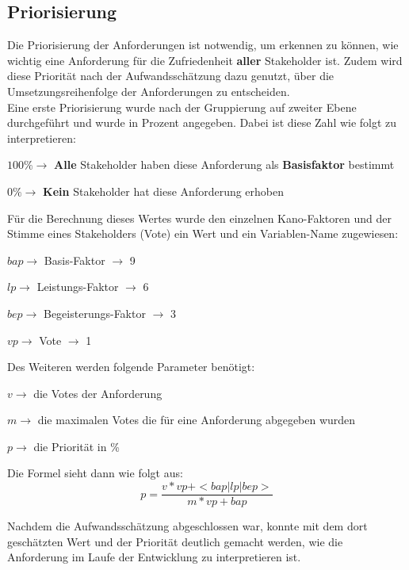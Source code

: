 \subsection{Priorisierung}
\label{subsec:priorisierung}

Die Priorisierung der Anforderungen ist notwendig, um erkennen zu können, wie wichtig eine Anforderung für die Zufriedenheit \textbf{aller} Stakeholder ist. Zudem wird diese Priorität nach der Aufwandsschätzung dazu genutzt, über die Umsetzungsreihenfolge der Anforderungen zu entscheiden.\\

Eine erste Priorisierung wurde nach der Gruppierung auf zweiter Ebene durchgeführt und wurde in Prozent angegeben. Dabei ist diese Zahl wie folgt zu interpretieren:
\begin{description}
\item $100\% \rightarrow$ \textbf{Alle} Stakeholder haben diese Anforderung als \textbf{Basisfaktor} bestimmt
\item $0\% \rightarrow$ \textbf{Kein} Stakeholder hat diese Anforderung erhoben
\end{description}

Für die Berechnung dieses Wertes wurde den einzelnen Kano-Faktoren und der Stimme eines Stakeholders (Vote) ein Wert und ein Variablen-Name zugewiesen:

\begin{description}
\item $ bap \rightarrow$ Basis-Faktor $\rightarrow$ 9
\item $ lp \rightarrow$ Leistungs-Faktor $\rightarrow$ 6
\item $ bep \rightarrow$ Begeisterungs-Faktor $\rightarrow$ 3
\item $ vp \rightarrow$ Vote $\rightarrow$ 1
\end{description}

Des Weiteren werden folgende Parameter benötigt:
\begin{description}
\item $ v \rightarrow$ die Votes der Anforderung
\item $ m \rightarrow$ die maximalen Votes die für eine Anforderung abgegeben wurden
\item $ p \rightarrow$ die Priorität in \%
\end{description}

Die Formel sieht dann wie folgt aus:
$$ p = \frac{v * vp + <bap|lp|bep>}{m*vp + bap}$$

Nachdem die Aufwandsschätzung abgeschlossen war, konnte mit dem dort geschätzten Wert und der Priorität deutlich gemacht werden, wie die Anforderung im Laufe der Entwicklung zu interpretieren ist.\\

